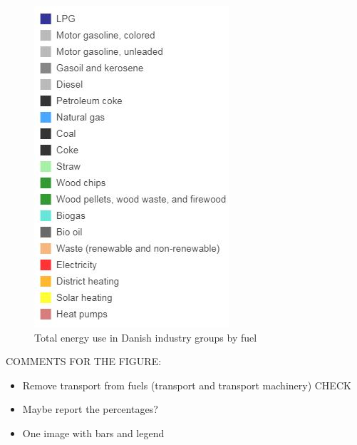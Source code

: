 \documentclass[review]{elsarticle}
\begin{document}
\begin{figure}
\begin{minipage}{.3\textwidth}
  \includegraphics[width=\linewidth]{Img/dan_ind/legend}
\end{minipage}
  \caption{Total energy use in Danish industry groups by fuel \cite{VM2015}}
  \label{total_use} 
\end{figure}

COMMENTS FOR THE FIGURE:
\begin{itemize}
    \item Remove transport from fuels (transport and transport machinery) CHECK
    \item Maybe report the percentages?
    \item One image with bars and legend
\end{itemize}
\end{document}

